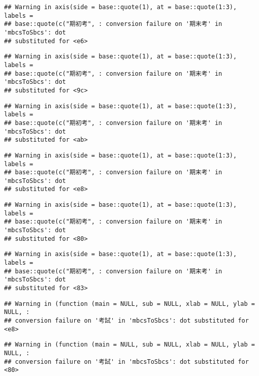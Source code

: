 \documentclass[
]{book}
\begin{document}
\begin{verbatim}
## Warning in axis(side = base::quote(1), at = base::quote(1:3), labels =
## base::quote(c("期初考", : conversion failure on '期末考' in 'mbcsToSbcs': dot
## substituted for <e6>
\end{verbatim}

\begin{verbatim}
## Warning in axis(side = base::quote(1), at = base::quote(1:3), labels =
## base::quote(c("期初考", : conversion failure on '期末考' in 'mbcsToSbcs': dot
## substituted for <9c>
\end{verbatim}

\begin{verbatim}
## Warning in axis(side = base::quote(1), at = base::quote(1:3), labels =
## base::quote(c("期初考", : conversion failure on '期末考' in 'mbcsToSbcs': dot
## substituted for <ab>
\end{verbatim}

\begin{verbatim}
## Warning in axis(side = base::quote(1), at = base::quote(1:3), labels =
## base::quote(c("期初考", : conversion failure on '期末考' in 'mbcsToSbcs': dot
## substituted for <e8>
\end{verbatim}

\begin{verbatim}
## Warning in axis(side = base::quote(1), at = base::quote(1:3), labels =
## base::quote(c("期初考", : conversion failure on '期末考' in 'mbcsToSbcs': dot
## substituted for <80>
\end{verbatim}

\begin{verbatim}
## Warning in axis(side = base::quote(1), at = base::quote(1:3), labels =
## base::quote(c("期初考", : conversion failure on '期末考' in 'mbcsToSbcs': dot
## substituted for <83>
\end{verbatim}

\begin{verbatim}
## Warning in (function (main = NULL, sub = NULL, xlab = NULL, ylab = NULL, :
## conversion failure on '考試' in 'mbcsToSbcs': dot substituted for <e8>
\end{verbatim}

\begin{verbatim}
## Warning in (function (main = NULL, sub = NULL, xlab = NULL, ylab = NULL, :
## conversion failure on '考試' in 'mbcsToSbcs': dot substituted for <80>
\end{verbatim}
\end{document}
